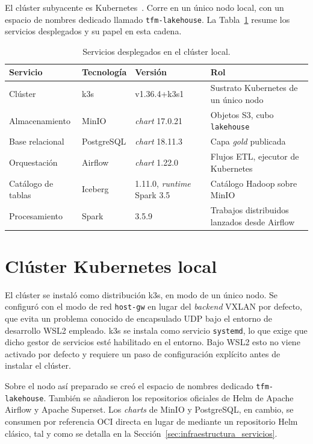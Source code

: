 El clúster subyacente es Kubernetes~\cite{cncf_kubernetes}. Corre en un
único nodo local, con un espacio de nombres dedicado llamado
\texttt{tfm-lakehouse}. La Tabla~\ref{tab:tfm_servicios_desplegados}
resume los servicios desplegados y su papel en esta cadena.

\begin{table}[H]
  \centering
  \small
  \renewcommand{\arraystretch}{1.2}
  \begin{tabular}{p{} p{} p{} p{}}
    \hline
    \textbf{Servicio} & \textbf{Tecnología} & \textbf{Versión} & \textbf{Rol} \\
    \hline
    Clúster & k3s & v1.36.4+k3s1 & Sustrato Kubernetes de un único nodo \\
    Almacenamiento & MinIO & \textit{chart} 17.0.21 & Objetos S3, cubo \texttt{lakehouse} \\
    Base relacional & PostgreSQL & \textit{chart} 18.11.3 & Capa \textit{gold} publicada \\
    Orquestación & Airflow & \textit{chart} 1.22.0 & Flujos ETL, ejecutor de Kubernetes \\
    Catálogo de tablas & Iceberg & 1.11.0, \textit{runtime} Spark 3.5 & Catálogo Hadoop sobre MinIO \\
    Procesamiento & Spark & 3.5.9 & Trabajos distribuidos lanzados desde Airflow \\
    \hline
  \end{tabular}
  \caption{Servicios desplegados en el clúster local.}
  \label{tab:tfm_servicios_desplegados}
\end{table}

\section{Clúster Kubernetes local}
\label{sec:infraestructura_k3s}

El clúster se instaló como distribución k3s, en modo de un único nodo. Se
configuró con el modo de red \texttt{host-gw} en lugar del
\textit{backend} VXLAN por defecto, que evita un problema conocido de
encapsulado UDP bajo el entorno de desarrollo WSL2 empleado. k3s se
instala como servicio \texttt{systemd}, lo que exige que dicho gestor de
servicios esté habilitado en el entorno. Bajo WSL2 esto no viene activado
por defecto y requiere un paso de configuración explícito antes de
instalar el clúster.

Sobre el nodo así preparado se creó el espacio de nombres dedicado
\texttt{tfm-lakehouse}. También se añadieron los repositorios oficiales de
Helm de Apache Airflow y Apache Superset. Los \textit{charts} de MinIO y
PostgreSQL, en cambio, se consumen por referencia OCI directa en lugar de
mediante un repositorio Helm clásico, tal y como se detalla en la
Sección~\ref{sec:infraestructura_servicios}.

